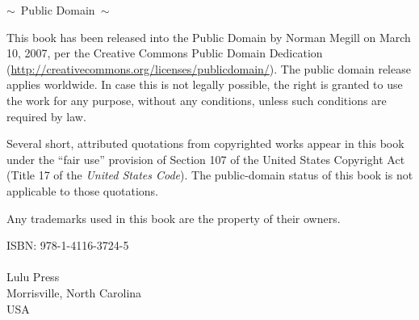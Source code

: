 \begin{center}
$\sim$\ {\sc Public Domain}\ $\sim$

\vspace{2ex}
This book has been released into the Public Domain by Norman Megill on
March 10, 2007, per the Creative Commons Public Domain Dedication
(\url{http://creativecommons.org/licenses/publicdomain/}).
The public domain release applies worldwide.  In case this is not
legally possible, the right is granted to use the work for any purpose,
without any conditions, unless such conditions are required by law.

\vspace{3ex}
Several short, attributed quotations from copyrighted works
appear in this book under the ``fair use'' provision of Section 107 of
the United States Copyright Act (Title 17 of the {\em United States
Code}).  The public-domain status of this book is not applicable to
those quotations.

\vspace{3ex}
Any trademarks used in this book are the property of their owners.


%
%
%
%

\vspace{7ex}
ISBN: 978-1-4116-3724-5 \\
{\ } \\
Lulu Press \\
Morrisville, North Carolina\\
USA



\end{center}
